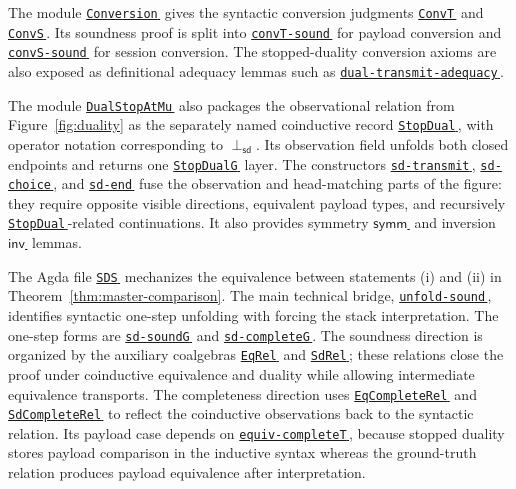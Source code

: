 \documentclass[submission,copyright,creativecommons]{eptcs}
\newcommand{\AgdaHen}{}
\newcommand{\AgdaLink}[2]{\href{src/#1}{\mbox{\texttt{#2}\,\AgdaHen}}}
\newcommand{\AgdaFile}[2]{\AgdaLink{#1.html}{#2}}
\newcommand{\AgdaName}[3]{\AgdaLink{#1.html\##2}{#3}}
\newcommand{\AgdaMathName}[3]{\href{src/#1.html\##2}{\mbox{#3\,\AgdaHen}}}
\newcommand{\StopDual}{\mathrel{\perp_{\mathsf{sd}}}}
\begin{document}
The module \AgdaFile{Conversion}{Conversion} gives the syntactic conversion
judgments \AgdaName{Conversion}{ConvT}{ConvT} and
\AgdaName{Conversion}{ConvS}{ConvS}.  Its soundness proof is split into
\AgdaName{Conversion}{convT-sound}{convT-sound} for payload conversion and
\AgdaName{Conversion}{convS-sound}{convS-sound} for session conversion.  The
stopped-duality conversion axioms are also exposed as definitional adequacy
lemmas such as
\AgdaName{Conversion}{dual-transmit-adequacy}{dual-transmit-adequacy}.

The module \AgdaFile{DualStopAtMu}{DualStopAtMu} also packages the
observational relation from
Figure~\ref{fig:duality} as the separately named coinductive record
\AgdaName{DualStopAtMu}{StopDual}{StopDual},
with operator notation corresponding to $\StopDual$.  Its observation field
unfolds both closed endpoints and returns one
\AgdaName{DualStopAtMu}{StopDualG}{StopDualG} layer.  The constructors
\AgdaName{DualStopAtMu}{StopDualG.sd-transmit}{sd-transmit},
\AgdaName{DualStopAtMu}{StopDualG.sd-choice}{sd-choice}, and
\AgdaName{DualStopAtMu}{StopDualG.sd-end}{sd-end} fuse the observation and
head-matching parts of the figure: they require opposite visible directions,
equivalent payload types, and recursively
\AgdaName{DualStopAtMu}{StopDual}{StopDual}-related continuations.  It also
provides symmetry
\AgdaMathName{DualStopAtMu}{2593}{$\mathsf{symm}$} and inversion
\AgdaMathName{DualStopAtMu}{3103}{$\mathsf{inv}$} lemmas.

The Agda file \AgdaFile{StopDualSoundness}{SDS} mechanizes the equivalence
between statements (i) and (ii) in Theorem~\ref{thm:master-comparison}.
The main technical bridge,
\AgdaName{StopDualSoundness}{unfold-sound}{unfold-sound}, identifies
syntactic one-step unfolding with forcing the stack interpretation.  The
one-step forms are \AgdaName{StopDualSoundness}{sd-soundG}{sd-soundG} and
\AgdaName{StopDualSoundness}{sd-completeG}{sd-completeG}.  The soundness
direction is organized by the auxiliary coalgebras
\AgdaName{StopDualSoundness}{EqRel}{EqRel} and
\AgdaName{StopDualSoundness}{SdRel}{SdRel}; these relations close the proof
under coinductive equivalence and duality while allowing intermediate
equivalence transports.  The completeness direction uses
\AgdaName{StopDualSoundness}{EqCompleteRel}{EqCompleteRel} and
\AgdaName{StopDualSoundness}{SdCompleteRel}{SdCompleteRel} to reflect the
coinductive observations back to the syntactic relation.  Its payload case
depends on \AgdaName{StopDualSoundness}{equiv-completeT}{equiv-completeT},
because stopped duality stores payload comparison in the inductive syntax
whereas the ground-truth relation produces payload equivalence after
interpretation.
\end{document}
